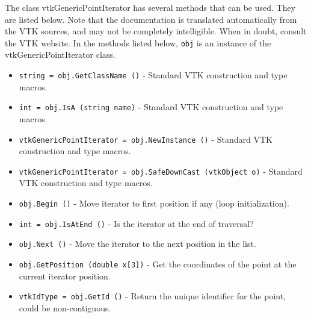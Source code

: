 The class vtkGenericPointIterator has several methods that can be used.
  They are listed below.
Note that the documentation is translated automatically from the VTK sources,
and may not be completely intelligible.  When in doubt, consult the VTK website.
In the methods listed below, \verb|obj| is an instance of the vtkGenericPointIterator class.
\begin{itemize}
\item  \verb|string = obj.GetClassName ()| -  Standard VTK construction and type macros.

\item  \verb|int = obj.IsA (string name)| -  Standard VTK construction and type macros.

\item  \verb|vtkGenericPointIterator = obj.NewInstance ()| -  Standard VTK construction and type macros.

\item  \verb|vtkGenericPointIterator = obj.SafeDownCast (vtkObject o)| -  Standard VTK construction and type macros.

\item  \verb|obj.Begin ()| -  Move iterator to first position if any (loop initialization).

\item  \verb|int = obj.IsAtEnd ()| -  Is the iterator at the end of traversal?

\item  \verb|obj.Next ()| -  Move the iterator to the next position in the list.
 

\item  \verb|obj.GetPosition (double x[3])| -  Get the coordinates of the point at the current iterator position.
 
 

\item  \verb|vtkIdType = obj.GetId ()| -  Return the unique identifier for the point, could be non-contiguous.
 

\end{itemize}
